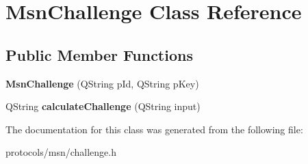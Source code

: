 \hypertarget{classMsnChallenge}{
\section{MsnChallenge Class Reference}
\label{classMsnChallenge}
}
\subsection*{Public Member Functions}
\begin{DoxyCompactItemize}
\item 
\hypertarget{classMsnChallenge_ababd5054592f2eac6ddbe5a47dbc25af}{
{\bfseries MsnChallenge} (QString pId, QString pKey)}
\label{classMsnChallenge_ababd5054592f2eac6ddbe5a47dbc25af}

\item 
\hypertarget{classMsnChallenge_ab5c244a5881cf3e4179dad2e3d0f6072}{
QString {\bfseries calculateChallenge} (QString input)}
\label{classMsnChallenge_ab5c244a5881cf3e4179dad2e3d0f6072}

\end{DoxyCompactItemize}


The documentation for this class was generated from the following file:\begin{DoxyCompactItemize}
\item 
protocols/msn/challenge.h\end{DoxyCompactItemize}
